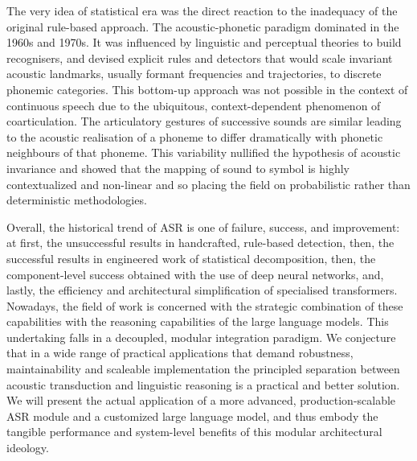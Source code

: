 The very idea of statistical era was the direct reaction to the inadequacy of the original rule-based approach. The acoustic-phonetic paradigm dominated in the 1960s and 1970s. It was influenced by linguistic and perceptual theories to build recognisers, and devised explicit rules and detectors that would scale invariant acoustic landmarks, usually formant frequencies and trajectories, to discrete phonemic categories. This bottom-up approach was not possible in the context of continuous speech due to the ubiquitous, context-dependent phenomenon of coarticulation. The articulatory gestures of successive sounds are similar leading to the acoustic realisation of a phoneme to differ dramatically with phonetic neighbours of that phoneme. This variability nullified the hypothesis of acoustic invariance and showed that the mapping of sound to symbol is highly contextualized and non-linear and so placing the field on probabilistic rather than deterministic methodologies.

Overall, the historical trend of ASR is one of failure, success, and improvement: at first, the unsuccessful results in handcrafted, rule-based detection, then, the successful results in engineered work of statistical decomposition, then, the component-level success obtained with the use of deep neural networks, and, lastly, the efficiency and architectural simplification of specialised transformers. Nowadays, the field of work is concerned with the strategic combination of these capabilities with the reasoning capabilities of the large language models. This undertaking falls in a decoupled, modular integration paradigm. We conjecture that in a wide range of practical applications that demand robustness, maintainability and scaleable implementation the principled separation between acoustic transduction and linguistic reasoning is a practical and better solution. We will present the actual application of a more advanced, production-scalable ASR module and a customized large language model, and thus embody the tangible performance and system-level benefits of this modular architectural ideology.

